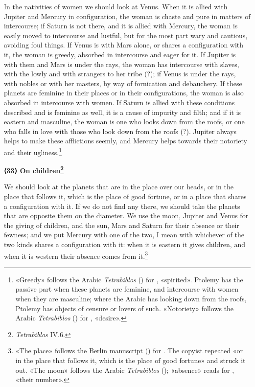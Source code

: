 \documentclass[11pt]{article}
\newcommand{\Fol}[1]{\marginpar{\footnotesize\color{gray}f.\,#1}}
\newcommand{\ChapterHead}[4]{\par\needspace{8\baselineskip}\bigskip\pdfbookmark[1]{#1}{ch-#2}\hypertarget{EN-K#2}{}%
 {\large\bfseries\interlinepenalty=10000 #1#4{\normalfont\normalsize#3}\par}\nobreak\medskip}
\begin{document}
\par In the nativities of women we should look at Venus. When it is allied with Jupiter and Mercury in configuration, the woman is chaste and pure in matters of intercourse; if Saturn is not there, and it is allied with Mercury, the woman is easily moved to intercourse and lustful, but for the most part wary and cautious, avoiding foul things. If Venus is with Mars alone, or shares a configuration with it, the woman is greedy, absorbed in intercourse and eager for it. If Jupiter is with them and Mars is under the rays, the woman has intercourse with slaves, with the lowly and with strangers to her tribe (?); if Venus is under the rays, with nobles or with her masters, by way of fornication and debauchery. If these planets are feminine in their places or in their configurations, the woman is also absorbed in intercourse with women. If Saturn is allied with these conditions described and is feminine as well, it is a cause of impurity and filth; and if it is eastern and masculine, the woman is one who looks down from the roofs, or one who falls in love with those who look down from the roofs (?). Jupiter always helps to make these afflictions seemly, and Mercury helps towards their notoriety and their ugliness.\footnote{«Greedy» follows the Arabic \emph{Tetrabiblos} () for , «spirited». Ptolemy has the passive part when these planets are feminine, and intercourse with women when they are masculine; where the Arabic has looking down from the roofs, Ptolemy has objects of censure or lovers of such. «Notoriety» follows the Arabic \emph{Tetrabiblos} () for , «desire».}\par
\ChapterHead{{\mdseries ⟨}33{\mdseries ⟩} On children}{33}{}{\footnote{\emph{Tetrabiblos} IV.6.}}
\par \Fol{70v}We should look at the planets that are in the place over our heads, or in the place that follows it, which is the place of good fortune, or in a place that shares a configuration with it. If we do not find any there, we should take the planets that are opposite them on the diameter. We use the moon, Jupiter and Venus for the giving of children, and the sun, Mars and Saturn for their absence or their fewness; and we put Mercury with one of the two, I mean with whichever of the two kinds shares a configuration with it: when it is eastern it gives children, and when it is western their absence comes from it.\footnote{«The place» follows the Berlin manuscript () for . The copyist repeated «or in the place that follows it, which is the place of good fortune» and struck it out. «The moon» follows the Arabic \emph{Tetrabiblos} (); «absence» reads  for , «their number».}\par
\end{document}
